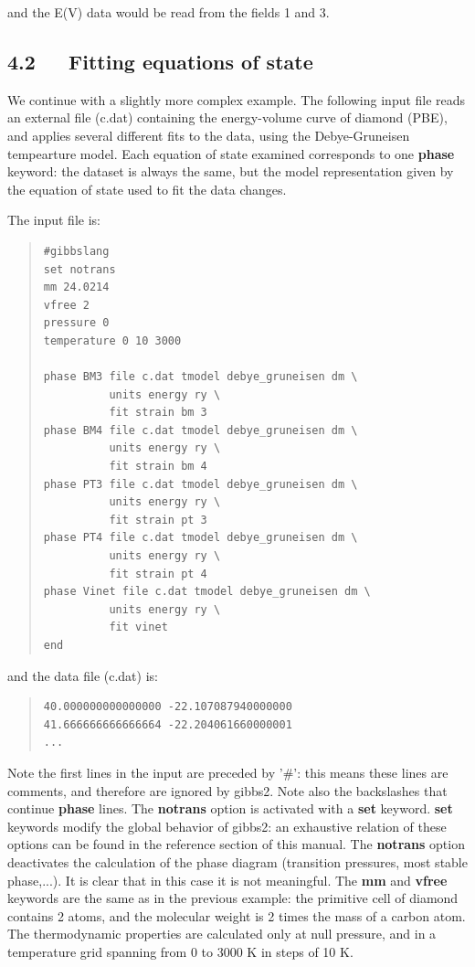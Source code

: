 \documentclass[a4paper]{article}
\begin{document}
and the E(V) data would be read from the fields 1 and 3.


\subsection{4.2   Fitting equations of state%
  \label{fitting-equations-of-state}%
}

We continue with a slightly more complex example. The following input
file reads an external file (c.dat) containing the energy-volume curve
of diamond (PBE), and applies several different fits to the
data, using the Debye-Gruneisen tempearture model. Each equation of
state examined corresponds to one \textbf{phase} keyword: the dataset is
always the same, but the model representation given by the equation of
state used to fit the data changes.

The input file is:

\begin{quote}
\begin{verbatim}
#gibbslang
set notrans
mm 24.0214
vfree 2
pressure 0
temperature 0 10 3000

phase BM3 file c.dat tmodel debye_gruneisen dm \
          units energy ry \
          fit strain bm 3
phase BM4 file c.dat tmodel debye_gruneisen dm \
          units energy ry \
          fit strain bm 4
phase PT3 file c.dat tmodel debye_gruneisen dm \
          units energy ry \
          fit strain pt 3
phase PT4 file c.dat tmodel debye_gruneisen dm \
          units energy ry \
          fit strain pt 4
phase Vinet file c.dat tmodel debye_gruneisen dm \
          units energy ry \
          fit vinet
end
\end{verbatim}
\end{quote}

and the data file (c.dat) is:

\begin{quote}
\begin{verbatim}
40.000000000000000 -22.107087940000000
41.666666666666664 -22.204061660000001
...
\end{verbatim}
\end{quote}

Note the first lines in the input are preceded by '\#': this means
these lines are comments, and therefore are ignored by gibbs2. Note
also the backslashes that continue \textbf{phase} lines. The \textbf{notrans}
option is activated with a \textbf{set} keyword. \textbf{set} keywords modify
the global behavior of gibbs2: an exhaustive relation of these options
can be found in the reference section of this manual. The \textbf{notrans}
option deactivates the calculation of the phase diagram (transition
pressures, most stable phase,...). It is clear that in this case it is
not meaningful. The \textbf{mm} and \textbf{vfree} keywords are the same as in
the previous example: the primitive cell of diamond contains 2 atoms,
and the molecular weight is 2 times the mass of a carbon atom. The
thermodynamic properties are calculated only at null pressure, and in
a temperature grid spanning from 0 to 3000 K in steps of 10 K.
\end{document}
